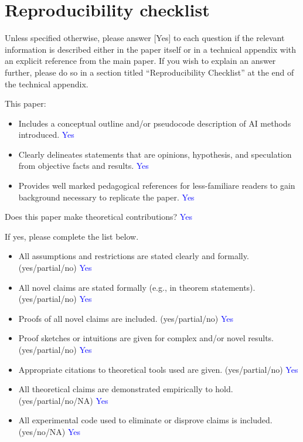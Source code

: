 \newcommand{\answerYes}[1]{\textcolor{blue}{#1}} 
\newcommand{\answerNo}[1]{\textcolor{yellow}{#1}} 
\newcommand{\answerNA}[1]{\textcolor{gray}{#1}} 
\newcommand{\answerPartial}[1]{\textcolor{green}{#1}}
\newcommand{\answerTODO}[1]{\textcolor{red}{#1}} 

\section{Reproducibility checklist}

Unless specified otherwise, please answer [Yes] to each question if the relevant information is described either in the paper itself or in a technical appendix with an explicit reference from the main paper. If you wish to explain an answer further, please do so in a section titled ``Reproducibility Checklist'' at the end of the technical appendix.

\noindent This paper:

\begin{itemize}
    \item Includes a conceptual outline and/or pseudocode description of AI methods introduced. \answerYes{Yes}
    \item Clearly delineates statements that are opinions, hypothesis, and speculation from objective facts and results. \answerYes{Yes}
    \item Provides well marked pedagogical references for less-familiare readers to gain background necessary to replicate the paper.  \answerYes{Yes}
\end{itemize}

\noindent Does this paper make theoretical contributions?  \answerYes{Yes}

\noindent If yes, please complete the list below.

\begin{itemize}
    \item All assumptions and restrictions are stated clearly and formally. (yes/partial/no) \answerYes{Yes}
    \item All novel claims are stated formally (e.g., in theorem statements). (yes/partial/no) \answerYes{Yes}
    \item Proofs of all novel claims are included. (yes/partial/no) \answerYes{Yes}
    \item Proof sketches or intuitions are given for complex and/or novel results.  (yes/partial/no) \answerYes{Yes}
    \item Appropriate citations to theoretical tools used are given. (yes/partial/no) \answerYes{Yes}
    \item All theoretical claims are demonstrated empirically to hold. (yes/partial/no/NA) \answerYes{Yes}
    \item All experimental code used to eliminate or disprove claims is included. (yes/no/NA) \answerYes{Yes}
\end{itemize}

